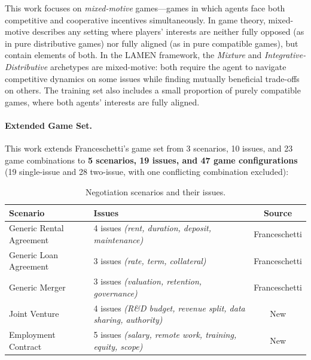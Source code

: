 \documentclass[12pt,a4paper]{article}
\begin{document}
This work focuses on \textit{mixed-motive} games---games in which agents face both competitive and cooperative incentives simultaneously. In game theory, mixed-motive describes any setting where players' interests are neither fully opposed (as in pure distributive games) nor fully aligned (as in pure compatible games), but contain elements of both. In the LAMEN framework, the \textit{Mixture} and \textit{Integrative-Distributive} archetypes are mixed-motive: both require the agent to navigate competitive dynamics on some issues while finding mutually beneficial trade-offs on others. The training set also includes a small proportion of purely compatible games, where both agents' interests are fully aligned.

\paragraph{Extended Game Set.} This work extends Franceschetti's game set from 3 scenarios, 10 issues, and 23 game combinations to \textbf{5 scenarios, 19 issues, and 47 game configurations} (19 single-issue and 28 two-issue, with one conflicting combination excluded):

\begin{table}[H]
\centering
\caption{Negotiation scenarios and their issues.}
\label{tab:scenarios}
\begin{tabular}{lp{5.5cm}c}
\toprule
\textbf{Scenario} & \textbf{Issues} & \textbf{Source} \\
\midrule
Generic Rental Agreement & 4 issues \newline \textit{(rent, duration, deposit, maintenance)} & Franceschetti \\
\addlinespace
Generic Loan Agreement & 3 issues \newline \textit{(rate, term, collateral)} & Franceschetti \\
\addlinespace
Generic Merger & 3 issues \newline \textit{(valuation, retention, governance)} & Franceschetti \\
\addlinespace
Joint Venture & 4 issues \newline \textit{(R\&D budget, revenue split, data sharing, authority)} & New \\
\addlinespace
Employment Contract & 5 issues \newline \textit{(salary, remote work, training, equity, scope)} & New \\
\bottomrule
\end{tabular}
\end{table}
\end{document}
